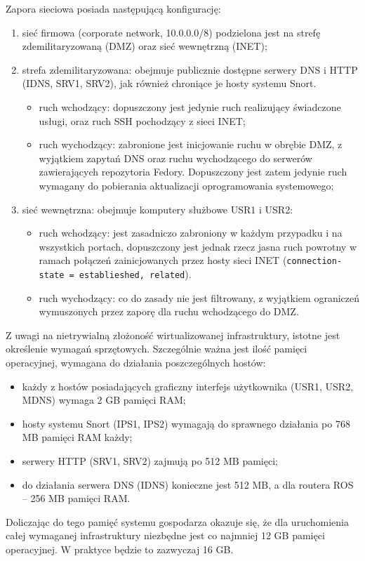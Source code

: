 \documentclass{eiti-raport}
\begin{document}
Zapora sieciowa posiada następującą konfigurację:
\begin{enumerate}
	\item sieć firmowa (corporate network, 10.0.0.0/8) podzielona jest na strefę zdemilitaryzowaną (DMZ) oraz sieć wewnętrzną (INET);
	\item strefa zdemilitaryzowana: obejmuje publicznie dostępne serwery DNS i HTTP (IDNS, SRV1, SRV2), jak również chroniące je hosty systemu Snort.
	\begin{itemize}
		\item ruch wchodzący: dopuszczony jest jedynie ruch realizujący świadczone usługi, oraz ruch SSH pochodzący z sieci INET;
		\item ruch wychodzący: zabronione jest inicjowanie ruchu w obrębie DMZ, z wyjątkiem zapytań DNS oraz ruchu wychodzącego do serwerów zawierających repozytoria Fedory. Dopuszczony jest zatem jedynie ruch wymagany do pobierania aktualizacji oprogramowania systemowego;
	\end{itemize}
	\item sieć wewnętrzna: obejmuje komputery służbowe USR1 i USR2:
	\begin{itemize}
		\item ruch wchodzący: jest zasadniczo zabroniony w każdym przypadku i na wszystkich portach, dopuszczony jest jednak rzecz jasna ruch powrotny w ramach połączeń zainicjowanych przez hosty sieci INET (\texttt{connection-state = establieshed, related}).
		\item ruch wychodzący: co do zasady nie jest filtrowany, z wyjątkiem ograniczeń wymuszonych przez zaporę dla ruchu wchodzącego do DMZ.
	\end{itemize}
\end{enumerate}
Z uwagi na nietrywialną złożoność wirtualizowanej infrastruktury, istotne jest określenie wymagań sprzętowych. Szczególnie ważna jest ilość pamięci operacyjnej, wymagana do działania poszczególnych hostów:
\begin{itemize}
	\item każdy z hostów posiadających graficzny interfejs użytkownika (USR1, USR2, MDNS) wymaga 2 GB pamięci RAM;
	\item hosty systemu Snort (IPS1, IPS2) wymagają do sprawnego działania po 768 MB pamięci RAM każdy;
	\item serwery HTTP (SRV1, SRV2) zajmują po 512 MB pamięci;
	\item do działania serwera DNS (IDNS) konieczne jest 512 MB, a dla routera ROS -- 256 MB pamięci RAM.
\end{itemize}
Doliczając do tego pamięć systemu gospodarza okazuje się, że dla uruchomienia całej wymaganej infrastruktury niezbędne jest co najmniej 12 GB pamięci operacyjnej. W praktyce będzie to zazwyczaj 16 GB. 
\end{document}
